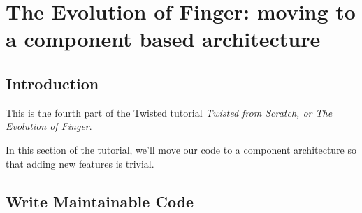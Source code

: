 \section{The Evolution of Finger: moving to a component based architecture\label{doc/howto/tutorial/components.xhtml}}


\subsection{Introduction}


 This is the fourth part of the Twisted tutorial \textit{Twisted from Scratch, or The Evolution of Finger}.

In this section of the tutorial, we'll move our code to a component architecture so that adding new features is trivial.

\subsection{Write Maintainable Code}


